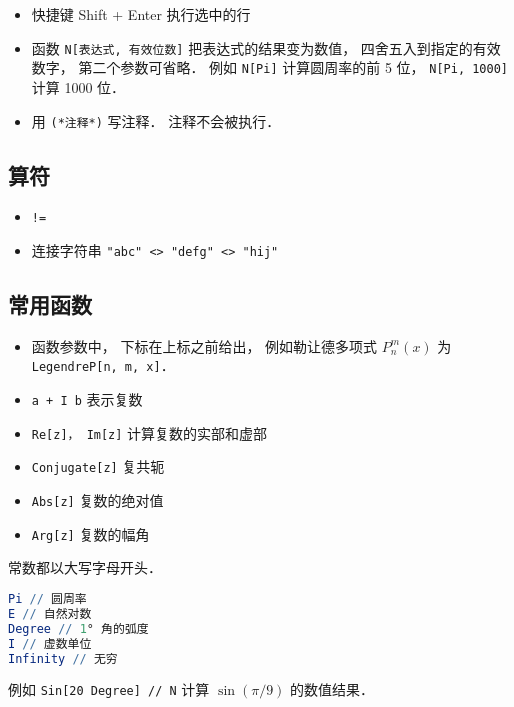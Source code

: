 
\begin{itemize}
\item 快捷键 Shift + Enter 执行选中的行
\item 函数 \verb|N[表达式, 有效位数]| 把表达式的结果变为数值， 四舍五入到指定的有效数字， 第二个参数可省略． 例如 \verb|N[Pi]| 计算圆周率的前 5 位， \verb|N[Pi, 1000]| 计算 1000 位．
\item 用 \verb|(*注释*)| 写注释． 注释不会被执行．
\end{itemize}

\subsection{算符}
\begin{itemize}
\item \verb|!=|
\item 连接字符串 \verb|"abc" <> "defg" <> "hij"|
\end{itemize}

\subsection{常用函数}
\begin{itemize}
\item 函数参数中， 下标在上标之前给出， 例如勒让德多项式 $P_n^m(x)$ 为 \verb|LegendreP[n, m, x]|．
\item \verb|a + I b| 表示复数
\item \verb|Re[z]， Im[z]| 计算复数的实部和虚部
\item \verb|Conjugate[z]| 复共轭
\item \verb|Abs[z]| 复数的绝对值
\item \verb|Arg[z]| 复数的幅角
\end{itemize}


常数都以大写字母开头．
\begin{lstlisting}[language=Mathematica]
Pi // 圆周率
E // 自然对数
Degree // 1° 角的弧度
I // 虚数单位
Infinity // 无穷
\end{lstlisting}
例如 \verb|Sin[20 Degree] // N| 计算 $\sin(\pi/9)$ 的数值结果．
